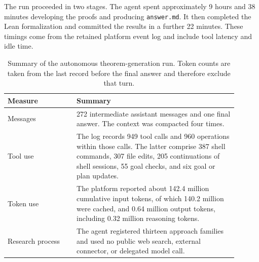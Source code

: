 \documentclass{article}
\theoremstyle{definition}
\theoremstyle{plain}
\begin{document}

The run proceeded in two stages. The agent spent approximately 9 hours and 38 minutes developing the proofs and producing \texttt{answer.md}. It then completed the Lean formalization and committed the results in a further 22 minutes. These timings come from the retained platform event log and include tool latency and idle time.




\begin{table}[H]
  \caption{Summary of the autonomous theorem-generation run. Token counts are
  taken from the last record before the final answer and therefore exclude
  that turn.}
  \label{tab:autonomous-metrics}
  \centering
  \begin{tabular}{L{0.27\linewidth}L{0.63\linewidth}}
    \toprule
    Measure & Summary \\
    \midrule
    Messages
      & 272 intermediate assistant messages and one final answer. The context was compacted
        four times. \\
    Tool use
      & The log records 949 tool calls and 960 operations within those calls.
        The latter comprise 387 shell commands, 307 file edits, 205
        continuations of shell sessions, 55 goal checks, and six goal or plan
        updates. \\
    Token use
      & The platform reported about 142.4 million cumulative input tokens, of
        which 140.2 million were cached, and 0.64 million output tokens,
        including 0.32 million reasoning tokens. \\
    Research process
      & The agent registered thirteen approach families and used no public web
        search, external connector, or delegated model call. \\
    \bottomrule
  \end{tabular}
\end{table}
\end{document}
